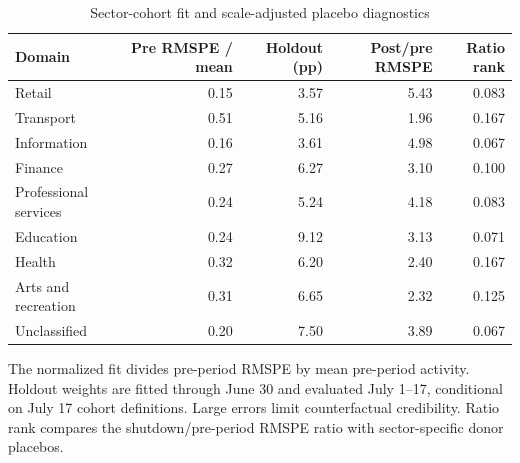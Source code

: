 \begin{table}[H]
\centering
\small
\caption{Sector-cohort fit and scale-adjusted placebo diagnostics}
\label{tab:sector_fit}
\begin{threeparttable}
\begin{tabular}{@{}p{}rrrr@{}}
\toprule
Domain & Pre RMSPE / mean & Holdout (pp) & Post/pre RMSPE & Ratio rank \\
\midrule
Retail & 0.15 & 3.57 & 5.43 & 0.083 \\
Transport & 0.51 & 5.16 & 1.96 & 0.167 \\
Information & 0.16 & 3.61 & 4.98 & 0.067 \\
Finance & 0.27 & 6.27 & 3.10 & 0.100 \\
Professional services & 0.24 & 5.24 & 4.18 & 0.083 \\
Education & 0.24 & 9.12 & 3.13 & 0.071 \\
Health & 0.32 & 6.20 & 2.40 & 0.167 \\
Arts and recreation & 0.31 & 6.65 & 2.32 & 0.125 \\
Unclassified & 0.20 & 7.50 & 3.89 & 0.067 \\
\bottomrule
\end{tabular}
\begin{tablenotes}[flushleft]
\footnotesize
\item The normalized fit divides pre-period RMSPE by mean pre-period activity. Holdout weights are fitted through June 30 and evaluated July 1--17, conditional on July 17 cohort definitions. Large errors limit counterfactual credibility. Ratio rank compares the shutdown/pre-period RMSPE ratio with sector-specific donor placebos.
\end{tablenotes}
\end{threeparttable}
\end{table}
